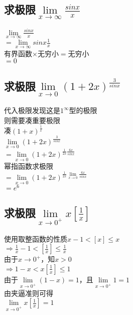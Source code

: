 \documentclass{article}
\begin{document}
\begin{flushleft}
\subsection{
	求极限$\lim\limits_{x\to \infty}\frac{sinx}{x}$
}
$\lim\limits_{x\to \infty}\frac{sinx}{x}$\\
$=\lim\limits_{x\to \infty}sinx\frac{1}{x}$\\
有界函数$\times$无穷小$=$无穷小\\
$=0$\\

\subsection{
求极限$\lim\limits_{x\to 0}(1+2x)^{\frac{3}{sinx}}$
}
代入极限发现这是$1^\infty$型的极限\\
则需要凑重要极限\\
凑$(1+x)^{\frac{1}{x}}$\\
$\lim\limits_{x\to 0}(1+2x)^{\frac{3}{sinx}}$\\
$=\lim\limits_{x\to 0}(1+2x)^{\frac{1}{2x}\frac{6x}{sinx}}$\\
幂指函数求极限\\
$=\lim\limits_{x\to 0}(1+2x)^{\frac{1}{2x}\lim\limits_{x\to 0}\frac{6x}{sinx}}$\\
$=e^6$\\

\subsection{
	求极限$\lim\limits_{x\to 0^+}x[\frac{1}{x}]$
}
使用取整函数的性质$x-1<[x]\le x$\\
$\Rightarrow \frac{1}{x}-1<[\frac{1}{x}]\le \frac{1}{x}$\\
由于$x\to 0^+$，知$x>0$\\
$\Rightarrow 1-x<x[\frac{1}{x}]\le 1$\\
由于$\lim\limits_{x\to 0^+}(1-x)=1$，且$\lim\limits_{x\to 0^+}1=1$\\
由夹逼准则可得\\
$\lim\limits_{x\to 0^+}x[\frac{1}{x}]=1$\\


\end{flushleft}
\end{document}
